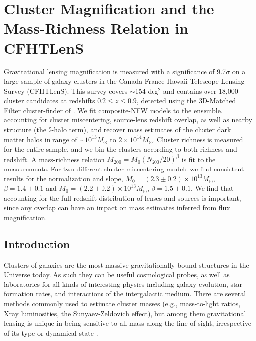 
\chapter{Cluster Magnification and the Mass-Richness Relation in CFHTLenS}

Gravitational lensing magnification is measured with a significance of 9.7$\sigma$ on a large sample of galaxy clusters in the Canada-France-Hawaii Telescope Lensing Survey (CFHTLenS). This survey covers $\sim$154 deg$^2$ and contains over 18,000 cluster candidates at redshifts $0.2 \leq z \leq 0.9$, detected using the 3D-Matched Filter cluster-finder of \citet{Milkeraitis10}. We fit composite-NFW models to the ensemble, accounting for cluster miscentering, source-lens redshift overlap, as well as nearby structure (the 2-halo term), and recover mass estimates of the cluster dark matter halos in range of $\sim10^{13} M_\odot$ to $2\times10^{14} M_\odot$. Cluster richness is measured for the entire sample, and we bin the clusters according to both richness and redshift. A mass-richness relation $M_{200} = M_0 (N_{200} / 20)^\beta$ is fit to the measurements. For two different cluster miscentering models we find consistent results for the normalization and slope,  $M_0 = (2.3 \pm 0.2) \times 10^{13} M_\odot$, $\beta = 1.4 \pm 0.1$ and $M_0 = (2.2 \pm 0.2) \times 10^{13} M_\odot$, $\beta = 1.5 \pm 0.1$. We find that accounting for the full redshift distribution of lenses and sources is important, since any overlap can have an impact on mass estimates inferred from flux magnification.


\section{Introduction}
Clusters of galaxies are the most massive gravitationally bound structures in the Universe today. As such they can be useful cosmological probes, as well as laboratories for all kinds of interesting physics including galaxy evolution, star formation rates, and interactions of the intergalactic medium. There are several methods commonly used to estimate cluster masses (e.g., mass-to-light ratios, Xray luminosities, the Sunyaev-Zeldovich effect), but among them gravitational lensing is unique in being sensitive to all mass along the line of sight, irrespective of its type or dynamical state \citep{BS01}.

